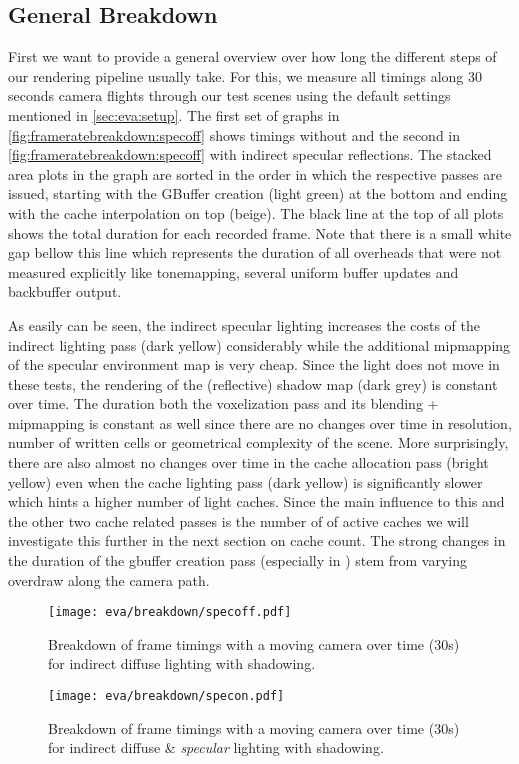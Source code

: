 \documentclass[thesis.tex]{subfiles}
\begin{document}
\subsection{General Breakdown}
First we want to provide a general overview over how long the different steps of our rendering pipeline usually take.
For this, we measure all timings along 30 seconds camera flights through our test scenes using the default settings mentioned in \autoref{sec:eva:setup}.
The first set of graphs in \autoref{fig:frameratebreakdown:specoff} shows timings without and the second in \autoref{fig:frameratebreakdown:specoff} with indirect specular reflections.
The stacked area plots in the graph are sorted in the order in which the respective passes are issued, starting with the GBuffer creation (light green) at the bottom and ending with the cache interpolation on top (beige).
The black line at the top of all plots shows the total duration for each recorded frame.
Note that there is a small white gap bellow this line which represents the duration of all overheads that were not measured explicitly like tonemapping, several uniform buffer updates and backbuffer output.

As easily can be seen, the indirect specular lighting increases the costs of the indirect lighting pass (dark yellow) considerably while the additional mipmapping of the specular environment map is very cheap.
Since the light does not move in these tests, the rendering of the (reflective) shadow map (dark grey) is constant over time.
The duration both the voxelization pass and its blending + mipmapping is constant as well since there are no changes over time in resolution, number of written cells or geometrical complexity of the scene.
More surprisingly, there are also almost no changes over time in the cache allocation pass (bright yellow) even when the cache lighting pass (dark yellow) is significantly slower which hints a higher number of light caches.
Since the main influence to this and the other two cache related passes is the number of of active caches we will investigate this further in the next section on cache count. 
The strong changes in the duration of the gbuffer creation pass (especially in ) stem from varying overdraw along the camera path. 

\begin{figure}
\centering
\texttt{[image: eva/breakdown/specoff.pdf]}
\caption{Breakdown of frame timings with a moving camera over time (30s) for indirect diffuse lighting with shadowing.}
\label{fig:frameratebreakdown:specoff}
\end{figure}
\begin{figure}
\centering
\texttt{[image: eva/breakdown/specon.pdf]}
\caption{Breakdown of frame timings with a moving camera over time (30s) for indirect diffuse \& \emph{specular} lighting with shadowing.}
\label{fig:frameratebreakdown:specon}
\end{figure}
\end{document}
